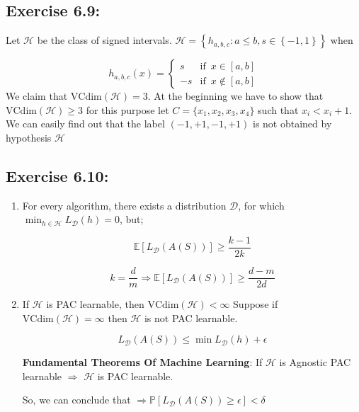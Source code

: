 \documentclass[]{book}
\begin{document}
\subsection*{Exercise 6.9:}
Let $\mathcal{H}$ be the class of signed intervals. $\mathcal{H}=\left \{ h_{a,b,c}:a\leq b,s \in\left \{ -1,1 \right \} \right \}$ when

\begin{equation*}
    h_{a,b,c}(x)=\left\{\begin{matrix}
s&\text{if}\,\,\,x\in[a,b]\\ 
-s&\text{if}\,\,\,x\notin[a,b]
\end{matrix}\right.
\end{equation*}
We claim that $\text{VCdim}(\mathcal{H})=3$. At the beginning we have to show that $\text{VCdim}(\mathcal{H})\geq 3$ for this purpose let $C=\{x_1,x_2,x_3,x_4\}$ such that $x_i< x_i+1$. We can easily find out that the label $(-1,+1,-1,+1)$ is not obtained by hypothesis $\mathcal{H}$

\subsection*{Exercise 6.10:}
\begin{enumerate}
    \item For every algorithm, there exists a distribution $\mathcal{D}$, for which  $\min_{h\in\mathcal{H}}L_{\mathcal{D}}(h)=0$, but;
    
    \begin{equation*}
        \mathbb{E}[L_\mathcal{D}(A(S))]\geq \frac{k-1}{2k}
    \end{equation*}
    
\begin{equation*}
    k=\frac{d}{m}\Rightarrow \mathbb{E}[L_\mathcal{D}(A(S))]\geq \frac{d-m}{2d}
\end{equation*}
    \item If $\mathcal{H}$ is PAC learnable, then $\text{VCdim}(\mathcal{H})<\infty$ 
    Suppose if $\text{VCdim}(\mathcal{H})=\infty$ then $\mathcal{H}$ is not PAC learnable.
    
    \begin{equation*}
        L_{\mathcal{D}}(A(S))\leq \min L_{\mathcal{D}}(h)+\epsilon
    \end{equation*}
    
    \textbf{Fundamental Theorems Of Machine Learning}: If $\mathcal{H}$ is Agnostic PAC learnable $\Rightarrow$ $\mathcal{H}$ is PAC learnable.  
    
    So, we can conclude that $\Rightarrow \mathbb{P}\left [ L_\mathcal D(A(S)) \geq \epsilon \right ]<\delta$
    
    
    
    
\end{enumerate}
\end{document}
